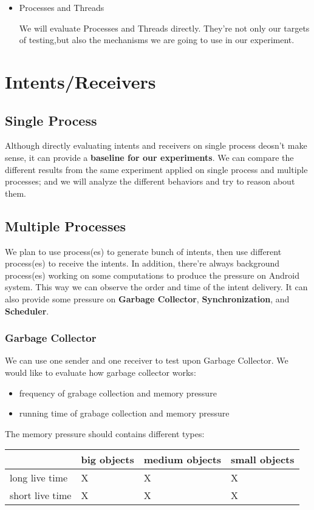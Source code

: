 \documentclass[11pt]{article}
\begin{document}
\begin{itemize}
\item Processes and Threads

We will evaluate Processes and Threads directly.
They're not only our targets of testing,but also the mechanisms we are going to use in our experiment.
\end{itemize}

\section{Intents/Receivers}
\label{sec-3}
\subsection{Single Process}
\label{sec-3-1}
Although directly evaluating intents and receivers on
single process deosn't make sense,
it can provide a \textbf{baseline for our experiments}.
We can compare the different results from the same experiment applied on single process
and multiple processes;
and we will analyze the different behaviors and try to reason about them.

\subsection{Multiple Processes}
\label{sec-3-2}
We plan to use process(es) to generate bunch of intents, then use different
process(es) to receive the intents.
In addition, there're always background process(es) working on some computations
to produce the pressure on Android system.
This way we can observe the order and time of the intent delivery.
It can also provide some pressure on \textbf{Garbage Collector}, \textbf{Synchronization}, and \textbf{Scheduler}.

\subsubsection{Garbage Collector}
\label{sec-3-2-1}
We can use one sender and one receiver to test upon Garbage Collector.
We would like to evaluate how garbage collector works:
\begin{itemize}
\item frequency of grabage collection and memory pressure
\item running time of grabage collection and memory pressure
\end{itemize}

The memory pressure should contains different \label{Memory-Pressure-Types}types:
\begin{center}
\begin{tabular}{l|lll}
 & big objects & medium objects & small objects\\
\hline
long live time & X & X & X\\
short live time & X & X & X\\
\end{tabular}
\end{center}
\end{document}
